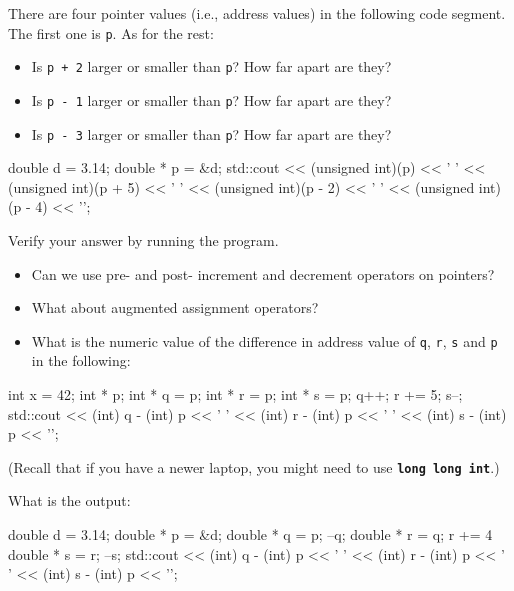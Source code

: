 \begin{ex}
There are four pointer values (i.e., address values)
in the following code segment. The first one is \texttt{p}. As for the
rest:

\begin{itemize}
\item Is \texttt{p + 2} larger or smaller than \texttt{p}? How far apart are
  they?
\item Is \texttt{p - 1} larger or smaller than \texttt{p}? How far apart are
  they?
\item Is \texttt{p - 3} larger or smaller than \texttt{p}? How far apart are
  they?
\end{itemize}

\begin{consolethree}[escapeinside=||]
double d = 3.14;
double * p = &d;
std::cout << (unsigned int)(p) << ' '
          << (unsigned int)(p + 5) << ' '
          << (unsigned int)(p - 2) << ' '
          << (unsigned int)(p - 4) << '\n';
\end{consolethree}

Verify your answer by running the program.
\end{ex}

\begin{ex}
\begin{itemize}
\item Can we use pre- and post- increment and decrement operators on
  pointers?
\item What about augmented assignment operators?
\item What is the numeric value of the difference in address value of
  \texttt{q}, \texttt{r}, \texttt{s} and \texttt{p} in the following:
\end{itemize}

\begin{consolethree}[escapeinside=||]
int x = 42;
int * p;
int * q = p;
int * r = p;
int * s = p;
q++;
r += 5;
s--;
std::cout << (int) q - (int) p
          << ' '
          << (int) r - (int) p
          << ' '
          << (int) s - (int) p
          << '\n';
\end{consolethree}

(Recall that if you have a newer laptop, you might need to use
\texttt{\textbf{long long int}}.)
\end{ex}

\begin{ex}
What is the output:

\begin{consolethree}[escapeinside=||]
double d = 3.14;
double * p = &d;
double * q = p;
--q;
double * r = q;
r += 4
double * s = r;
--s;
std::cout << (int) q - (int) p
          << ' '
          << (int) r - (int) p
          << ' '
          << (int) s - (int) p << '\n';
\end{consolethree}
\end{ex}


